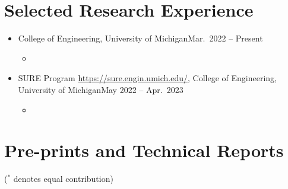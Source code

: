 \documentclass[letterpaper,10.8pt]{article}
\begin{document}
\section{Selected Research Experience}
\begin{itemize}
  \item {}
        {College of Engineering, University of Michigan}{Mar.\ 2022 -- Present}
        \begin{itemize}
          \item {}
        \end{itemize}

  \item {}
        {SURE Program \url{https://sure.engin.umich.edu/}, College of Engineering, University of Michigan}{May 2022 -- Apr.\ 2023}
        \begin{itemize}
          \item {}
        \end{itemize}
\end{itemize}


\section{Pre-prints and Technical Reports}
\begin{flushright}
  (\(^*\) denotes equal contribution)\vspace{-5pt}
\end{flushright}

\begin{publication}[P]
  \item {}
  \item {}
\end{publication}
\end{document}
